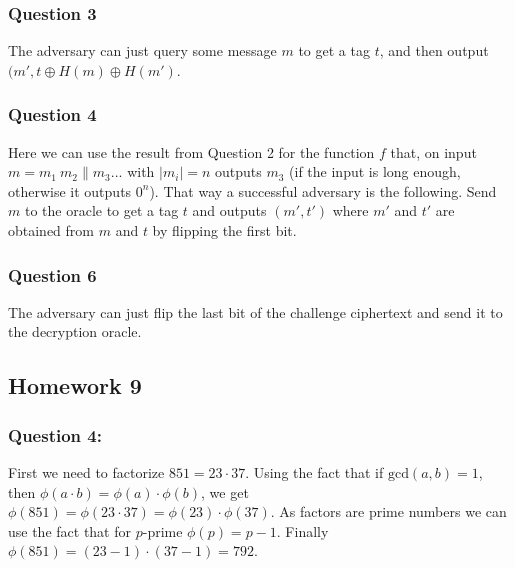 \documentclass{article}
\numberwithin{defn}{section}
\numberwithin{equation}{section}
\begin{document}
	\subsubsection*{Question 3}
	The adversary can just query some message $m$ to get a tag $t$, and then output $(m', t\oplus H(m)\oplus H(m')$.
	
	\subsubsection*{Question 4}
	Here we can use the result from Question 2 for the function $f$ that, on input $m=m_1\ m_2\|m_3...$ with $|m_i|=n$ outputs $m_3$ (if the input is long enough, otherwise it outputs $0^n$). That way a successful adversary is the following. Send $m$ to the oracle to get a tag $t$ and outputs $(m', t')$ where $m'$ and $t'$ are obtained from $m$ and $t$ by flipping the first bit.
	
	\subsubsection*{Question 6}
	
	The adversary can just flip the last bit of the challenge ciphertext and send it to the decryption oracle.
	
	
\subsection*{Homework 9}


\subsubsection*{Question 4:} 
First we need to factorize $851=23\cdot 37$. Using the fact that if $\text{gcd}(a,b)=1$, then $\phi(a\cdot b)=\phi(a)\cdot\phi(b)$, we get $\phi(851)=\phi(23\cdot 37)=\phi(23)\cdot\phi( 37)$. As factors are prime numbers we can use the fact that for $p$-prime $\phi(p)=p-1$. Finally $\phi(851)=(23-1)\cdot(37-1)=792$.
\end{document}
